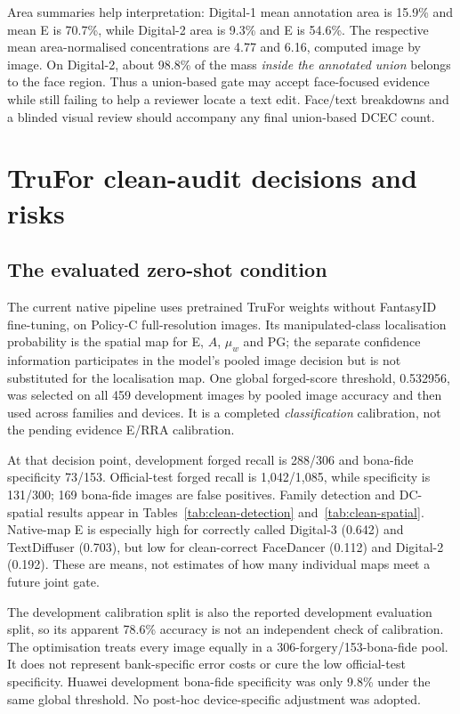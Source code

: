 Area summaries help interpretation: Digital-1 mean annotation area is 15.9\% and mean E is 70.7\%, while Digital-2 area is 9.3\% and E is 54.6\%. The respective mean area-normalised concentrations are 4.77 and 6.16, computed image by image. On Digital-2, about 98.8\% of the mass \emph{inside the annotated union} belongs to the face region. Thus a union-based gate may accept face-focused evidence while still failing to help a reviewer locate a text edit. Face/text breakdowns and a blinded visual review should accompany any final union-based DCEC count.

\chapter{TruFor clean-audit decisions and risks}
\label{app:clean-trufor}

\section{The evaluated zero-shot condition}

The current native pipeline uses pretrained TruFor weights without FantasyID fine-tuning, on Policy-C full-resolution images. Its manipulated-class localisation probability is the spatial map for E, $A$, $\mu_w$ and PG; the separate confidence information participates in the model's pooled image decision but is not substituted for the localisation map. One global forged-score threshold, 0.532956, was selected on all 459 development images by pooled image accuracy and then used across families and devices. It is a completed \emph{classification} calibration, not the pending evidence E/RRA calibration.

At that decision point, development forged recall is 288/306 and bona-fide specificity 73/153. Official-test forged recall is 1,042/1,085, while specificity is 131/300; 169 bona-fide images are false positives. Family detection and DC-spatial results appear in Tables~\ref{tab:clean-detection} and~\ref{tab:clean-spatial}. Native-map E is especially high for correctly called Digital-3 (0.642) and TextDiffuser (0.703), but low for clean-correct FaceDancer (0.112) and Digital-2 (0.192). These are means, not estimates of how many individual maps meet a future joint gate.

The development calibration split is also the reported development evaluation split, so its apparent 78.6\% accuracy is not an independent check of calibration. The optimisation treats every image equally in a 306-forgery/153-bona-fide pool. It does not represent bank-specific error costs or cure the low official-test specificity. Huawei development bona-fide specificity was only 9.8\% under the same global threshold. No post-hoc device-specific adjustment was adopted.

